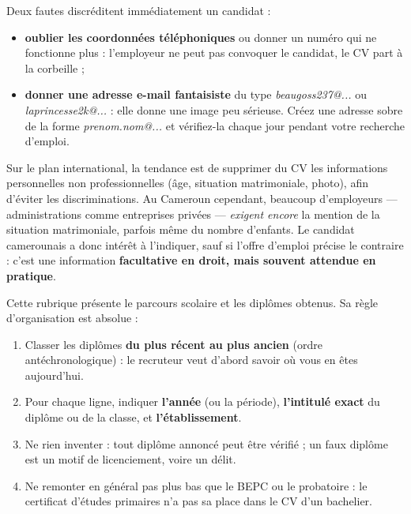 \documentclass[11pt]{article}
\newcommand{\cle}[1]{{\popxbold\color{popdark}#1}}
\newcounter{popsec}
\newcounter{popsub}
\newcommand{\courssub}[1]{%
  \stepcounter{popsub}%
  \par\vspace{9pt}\noindent{\popxbold\fontsize{11.5}{13}\selectfont\color{popink}{\color{poporange}\thepopsec.\thepopsub}\hspace{6pt}#1}\par\nopagebreak\vspace{4pt}
}
\begin{document}
\begin{attention}
Deux fautes discréditent immédiatement un candidat :
\begin{itemize}
\item \textbf{oublier les coordonnées téléphoniques} ou donner un numéro qui ne fonctionne plus : l'employeur ne peut pas convoquer le candidat, le CV part à la corbeille ;
\item \textbf{donner une adresse e-mail fantaisiste} du type \emph{beaugoss237@...} ou \emph{laprincesse2k@...} : elle donne une image peu sérieuse. Créez une adresse sobre de la forme \emph{prenom.nom@...} et vérifiez-la chaque jour pendant votre recherche d'emploi.
\end{itemize}
\end{attention}

\begin{savaistu}
Sur le plan international, la tendance est de supprimer du CV les informations personnelles non professionnelles (âge, situation matrimoniale, photo), afin d'éviter les discriminations. Au Cameroun cependant, beaucoup d'employeurs — administrations comme entreprises privées — \emph{exigent encore} la mention de la situation matrimoniale, parfois même du nombre d'enfants. Le candidat camerounais a donc intérêt à l'indiquer, sauf si l'offre d'emploi précise le contraire : c'est une information \textbf{facultative en droit, mais souvent attendue en pratique}.
\end{savaistu}

\courssub{La rubrique « Formation / Diplômes »}

Cette rubrique présente le parcours scolaire et les diplômes obtenus. Sa règle d'organisation est absolue :

\begin{methode}
\begin{enumerate}
\item Classer les diplômes \textbf{du plus récent au plus ancien} (ordre \cle{antéchronologique}) : le recruteur veut d'abord savoir où vous en êtes aujourd'hui.
\item Pour chaque ligne, indiquer \textbf{l'année} (ou la période), \textbf{l'intitulé exact} du diplôme ou de la classe, et \textbf{l'établissement}.
\item Ne rien inventer : tout diplôme annoncé peut être vérifié ; un faux diplôme est un motif de licenciement, voire un délit.
\item Ne remonter en général pas plus bas que le BEPC ou le probatoire : le certificat d'études primaires n'a pas sa place dans le CV d'un bachelier.
\end{enumerate}
\end{methode}
\end{document}
